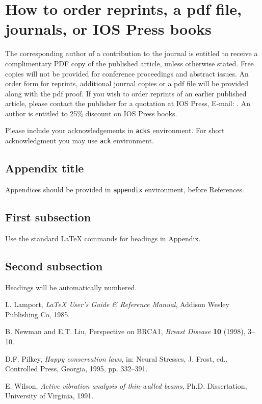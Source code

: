 \documentclass[bsi]{iosart2x}
\begin{document}
\section{How to order reprints, a pdf file, journals, or IOS Press
books}
The corresponding author of a contribution to the journal is entitled to receive a complimentary PDF copy of the published article, unless otherwise stated.
Free copies will not be provided for conference proceedings and abstract issues. An order form for reprints,
additional journal copies or a pdf file will be provided along with the pdf proof.
If you wish to order reprints of an earlier published article, please contact the publisher for a quotation at IOS Press, E-mail: .
An author is entitled to 25\% discount on IOS Press books.


\begin{acks}
Please include your acknowledgements in \verb|acks| environment. For short acknowledgment you may use \verb|ack| environment.
\end{acks}

\begin{appendix}
\section{Appendix title}
Appendices should be provided in \verb|appendix| environment, before References.

\subsection{First subsection}
Use the standard \LaTeX{} commands for headings in Appendix.

\subsection{Second subsection}
Headings will be automatically numbered. 
\end{appendix}


\begin{thebibliography}{0}

 L. Lamport, \textit{\LaTeX{} User's Guide \& Reference Manual},
 Addison Wesley Publishing Co, 1985.

 B. Newman and E.T. Liu, Perspective on BRCA1, \textit{Breast Disease} \textbf{10} (1998), 3--10. 

 D.F. Pilkey, \textit{Happy conservation laws}, in: Neural Stresses, J. Frost, ed., Controlled Press, Georgia, 1995, pp. 332--391.

 E. Wilson, \textit{Active vibration analysis of thin-walled beams}, Ph.D. Dissertation, University of Virginia, 1991.

\end{thebibliography}
\end{document}
